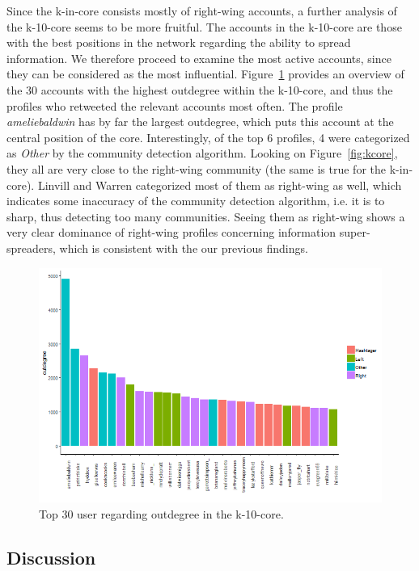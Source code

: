 \documentclass[12pt, titlepage=true, toc=bib]{scrartcl}
\begin{document}
Since the k-in-core consists mostly of right-wing accounts, a further analysis of the k-10-core seems to be more fruitful. The accounts in the k-10-core are those with the best positions in the network regarding the ability to spread information. We therefore proceed to examine the most active accounts, since they can be considered as the most influential. Figure~\ref{fig:k10in} provides an overview of the 30 accounts with the highest outdegree within the k-10-core, and thus the profiles who retweeted the relevant accounts most often. The profile \textit{ameliebaldwin} has by far the largest outdegree, which puts this account at the central position of the core. Interestingly, of the top 6 profiles, 4 were categorized as \textit{Other} by the community detection algorithm. Looking on Figure~\ref{fig:kcore}, they all are very close to the right-wing community (the same is true for the k-in-core). Linvill and Warren categorized most of them as right-wing as well, which indicates some inaccuracy of the community detection algorithm, i.e. it is to sharp, thus detecting too many communities. Seeing them as right-wing shows a very clear dominance of right-wing profiles concerning information super-spreaders, which is consistent with the our previous findings.

\begin{figure}[!ht]
\centering
\includegraphics[width=0.95\linewidth]{k10_figure}
\caption[Outdegree in the k-core]{Top 30 user regarding outdegree in the k-10-core.}
\label{fig:k10in}
\end{figure}


\subsection{Discussion}
\end{document}
